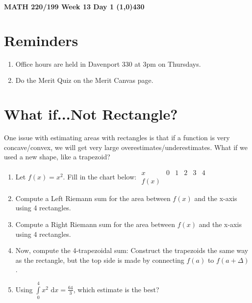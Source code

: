 \documentclass{article}
\begin{document}
\begin{center}
 \LARGE\bfseries MATH 220/199 Week 13 Day 1
 \line(1,0){430}
\end{center}
\section*{Reminders}
\begin{enumerate}
    \item Office hours are held in Davenport 330 at 3pm on Thursdays.
    \item Do the Merit Quiz on the Merit Canvas page.
\end{enumerate}
\section*{What if...Not Rectangle?}
One issue with estimating areas with rectangles is that if a function is very concave/convex, we will get very large overestimates/underestimates. What if we used a new shape, like a trapezoid?
\begin{enumerate}
    \item Let $f(x) = x^2$. Fill in the chart below:
    \newline
    \newline
    $\begin{array}{c|c|c|c|c|c}
        x & 0 & 1 & 2 & 3 & 4 \\
        \hline
        f(x) & & & & & 
    \end{array}$
    \item Compute a Left Riemann sum for the area between $f(x)$ and the x-axis using 4 rectangles.
    \vfill
    \item Compute a Right Riemann sum for the area between $f(x)$ and the x-axis using 4 rectangles.
    \vfill
    \item Now, compute the 4-trapezoidal sum: Construct the trapezoids the same way as the rectangle, but the top side is made by connecting $f(a)$ to $f(a+\Delta)$.
    \vfill
    \item Using $\int\limits_{0}^4 x^2 \text{ d}x = \frac{64}{3}$, which estimate is the best?
    \vfill
\end{enumerate}
\newpage
\end{document}
